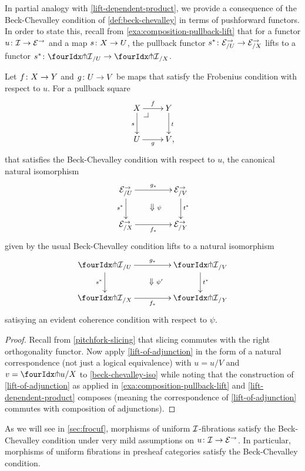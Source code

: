 \documentclass[reqno,10pt,a4paper,oneside,draft]{amsart}
\begin{document}
In partial analogy with \cref{lift-dependent-product}, we provide a consequence of the Beck-Chevalley condition of \cref{def:beck-chevalley} in terms of pushforward functors.
In order to state this, recall from \cref{exa:composition-pullback-lift} that for a functor $u \co \cal{I} \to \catE^\to$ and a map $s \co X \to U$, the pullback functor $s^* \co \catE^\to_{/U} \to \catE^\to_{/X}$ lifts to a functor $s^* \co {\liftr{\cal{I}}}_{/U} \to {\liftr{\cal{I}}}_{/X}$.

\begin{proposition} \label{lift-pushforward-BC}
Let $f \co X \to Y$ and $g \co U \to V$ be maps that satisfy the Frobenius condition with respect to $u$.
For a pullback square
\[
\xymatrix{
  X
  \ar[r]^{f}
  \ar[d]_{s}
  \pullback{dr}
&
  Y
  \ar[d]^{t}
\\
  U
  \ar[r]_{g}
&
  V
\rlap{,}}
\]
that satisfies the Beck-Chevalley condition with respect to $u$, the canonical natural isomorphism
\[
\xymatrix@C+2em{
  \catE^\to_{/U}
  \ar[r]^{g_*}
  \ar[d]_{s^*}
  \ar@{}[dr]|{\textstyle\Downarrow \rlap{$\labelstyle\psi$}}
&
  \catE^\to_{/V}
  \ar[d]^{t^*}
\\
  \catE^\to_{/X}
  \ar[r]_{f_*}
&
  \catE^\to_{/Y}
}
\]
given by the usual Beck-Chevalley condition lifts to a natural isomorphism
\[
\xymatrix@C+2em{
  {\liftr{\cal{I}}}_{/U}
  \ar[r]^{g_*}
  \ar[d]_{s^*}
  \ar@{}[dr]|{\textstyle\Downarrow \rlap{$\labelstyle\psi'$}}
&
  {\liftr{\cal{I}}}_{/V}
  \ar[d]^{t^*}
\\
  {\liftr{\cal{I}}}_{/X}
  \ar[r]_{f_*}
&
  {\liftr{\cal{I}}}_{/Y}
}
\]
satisying an evident coherence condition with respect to $\psi$.
\end{proposition}

\begin{proof}
Recall from \cref{pitchfork-slicing} that slicing commutes with the right orthogonality functor.
Now apply \cref{lift-of-adjunction} in the form of a natural correspondence (not just a logical equivalence) with $u = u/V$ and $v = \liftr{u}/X$ to \cref{beck-chevalley-iso} while noting that the construction of \cref{lift-of-adjunction} as applied in \cref{exa:composition-pullback-lift} and \cref{lift-dependent-product} composes (meaning the correspondence of \cref{lift-of-adjunction} commutes with composition of adjunctions).
\end{proof}

As we will see in \cref{sec:frocuf}, morphisms of uniform $\cal{I}$-fibrations satisfy the Beck-Chevalley condition under very mild assumptions on $u \co \cal{I} \to \catE^\to$.
In particular, morphisms of uniform fibrations in presheaf categories satisfy the Beck-Chevalley condition.
\end{document}

